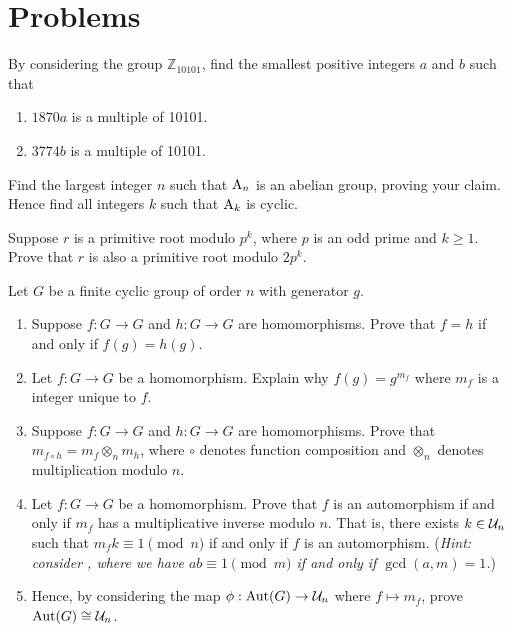 \newpage

\section{Problems}
\begin{problem}
    By considering the group $\mathbb{Z}_{10101}$, find the smallest positive integers $a$ and $b$ such that
    \begin{enumerate}[label=(\alph*)]
        \item $1870a$ is a multiple of 10101.
        \item $3774b$ is a multiple of 10101.
    \end{enumerate}
\end{problem}

\begin{problem}
    Find the largest integer $n$ such that $\mathrm{A}_{n}$ is an abelian group, proving your claim. Hence find all integers $k$ such that $\mathrm{A}_{k}$ is cyclic.
\end{problem}

\begin{problem}
    Suppose $r$ is a primitive root modulo $p^k$, where $p$ is an odd prime and $k \geq 1$. Prove that $r$ is also a primitive root modulo $2p^k$.
\end{problem}

\begin{problem}
    Let $G$ be a finite cyclic group of order $n$ with generator $g$.
    \begin{enumerate}[label=(\roman*)]
        \item Suppose $f: G \to G$ and $h: G \to G$ are homomorphisms. Prove that $f = h$ if and only if $f(g) = h(g)$.
        \item Let $f: G \to G$ be a homomorphism. Explain why $f(g) = g^{m_f}$ where $m_f$ is a integer unique to $f$.
        \item Suppose $f: G \to G$ and $h: G \to G$ are homomorphisms. Prove that $m_{f\circ h} = m_f \otimes_n m_h$, where $\circ$ denotes function composition and $\otimes_n$ denotes multiplication modulo $n$.
        \item Let $f: G \to G$ be a homomorphism. Prove that $f$ is an automorphism if and only if $m_f$ has a multiplicative inverse modulo $n$. That is, there exists $k \in \mathcal{U}_{n}$ such that $m_fk \equiv 1 \pmod n$ if and only if $f$ is an automorphism.\newline
        (\textit{Hint: consider , where we have $ab \equiv 1 \pmod m$ if and only if $\gcd(a, m) = 1$.})
        \item Hence, by considering the map $\phi: \mathrm{Aut}(G) \to \mathcal{U}_{n}$ where $f \mapsto m_f$, prove $\mathrm{Aut}(G) \cong \mathcal{U}_{n}$. 
    \end{enumerate}
\end{problem}

